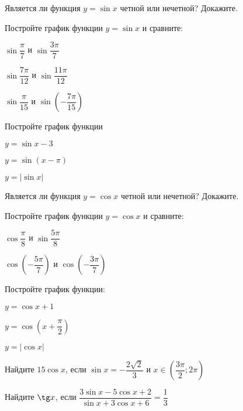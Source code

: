 \begin{consultation}
	\begin{listofex}
		\item Является ли функция \( y=\sin x \) четной или нечетной? Докажите.
		\item Постройте график функции \( y=\sin x \) и сравните:
		\begin{enumcols}[itemcolumns=3]
			\item \( \sin\dfrac{\pi}{7} \) и \( \sin\dfrac{3\pi}{7} \)
			\item \( \sin\dfrac{7\pi}{12} \) и \( \sin\dfrac{11\pi}{12} \)
			\item \( \sin\dfrac{\pi}{15} \) и \( \sin\left( -\dfrac{7\pi}{15} \right) \)
		\end{enumcols}
		\item Постройте график функции
		\begin{enumcols}[itemcolumns=3]
			\item \( y= \sin x - 3 \)
			\item \( y= \sin(x-\pi) \)
			\item \( y=|\sin x| \)
		\end{enumcols} 
		\item Является ли функция \( y=\cos x \) четной или нечетной? Докажите.
		\item Постройте график функции \( y=\cos x \) и сравните:
		\begin{enumcols}[itemcolumns=2]
			\item \( \cos\dfrac{\pi}{8} \) и \( \sin\dfrac{5\pi}{8} \)
			\item \( \cos\left( -\dfrac{5\pi}{7} \right) \) и \( \cos\left( -\dfrac{3\pi}{7} \right) \)
		\end{enumcols}
		\item Постройте график функции:
		\begin{enumcols}[itemcolumns=3]
			\item \( y=\cos x + 1 \)
			\item \( y=\cos\left( x+\dfrac{\pi}{2} \right) \)
			\item \( y=|\cos x| \)
		\end{enumcols}
		\item Найдите \( 15\cos x \), если \( \sin x = -\dfrac{2\sqrt{2}}{3} \) и \( x\in\left( \dfrac{3\pi}{2};2\pi \right) \)
		\item Найдите \( \tg x \), если \( \dfrac{3\sin x - 5\cos x + 2}{\sin x + 3\cos x + 6}=\dfrac{1}{3} \)
	\end{listofex}
\end{consultation}
